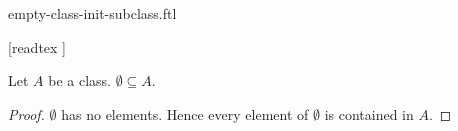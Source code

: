 \documentclass{stex}
\begin{document}
\begin{smodule}{empty-class-init-subclass.ftl}

  \begin{forthel}

    [readtex ]
  \end{forthel}

  \begin{forthel}
    \begin{proposition}
      Let $A$ be a class.
      $\emptyset \subseteq A$.
    \end{proposition}
    \begin{proof}
      $\emptyset$ has no elements.
      Hence every element of $\emptyset$ is contained in $A$.
    \end{proof}
  \end{forthel}
\end{smodule}
\end{document}
